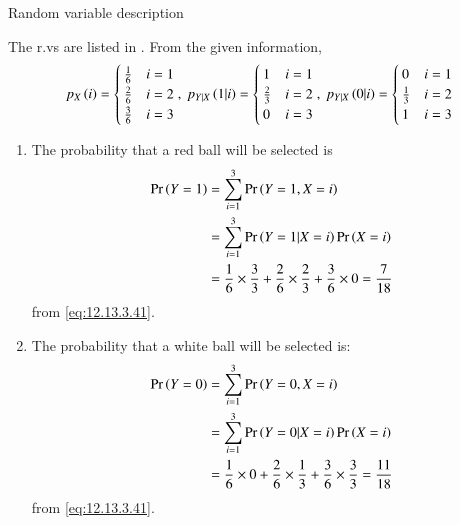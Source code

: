 \begin{table}[!ht]

\caption{Random variable description}
\label{tab:exemplar 12.13.3.41}
\end{table}
The r.vs are listed in 
.  From the given information,
\begin{align}
\label{eq:12.13.3.41}
p_{X}\brak{i}=
\begin{cases}
\frac{1}{6} & i=1\\
\frac{2}{6} & i=2\\
\frac{3}{6} & i=3
\end{cases}
,\
p_{Y|X}\brak{1|i}=
\begin{cases}
1 & i=1\\
\frac{2}{3} & i=2\\
0 & i=3
\end{cases}
,\
p_{Y|X}\brak{0|i}=
\begin{cases}
0 & i=1\\
\frac{1}{3} & i=2\\
1 & i=3
\end{cases}
\end{align}
%
\begin{enumerate}
\item
The probability that a red ball will be selected is
\begin{align}
	\Pr\left(Y=1\right)&=\sum_{i=1}^{3}\Pr\left(Y=1,X=i\right)\\
&=\sum_{i=1}^{3}\Pr\left(Y=1 | X=i\right)\Pr\left(X=i\right) \\
&=\frac{1}{6}\times\frac{3}{3}+\frac{2}{6}\times\frac{2}{3}+\frac{3}{6}\times0
=\frac{7}{18}
\end{align}
from \eqref{eq:12.13.3.41}.
\item
The probability that a white ball will be selected is:
\begin{align}
	\Pr\left(Y=0\right)&=\sum_{i=1}^{3}\Pr\left(Y=0,X=i\right)\\
&=\sum_{i=1}^{3}\Pr\left(Y=0 | X=i\right)\Pr\left(X=i\right) \\
&=\frac{1}{6}\times0+\frac{2}{6}\times\frac{1}{3}+\frac{3}{6}\times\frac{3}{3}
=\frac{11}{18}
\end{align}
from \eqref{eq:12.13.3.41}.
\end{enumerate}



